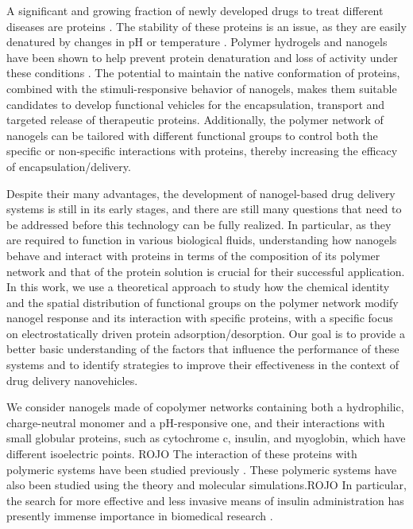 A significant and growing fraction of newly developed drugs to treat different diseases are proteins .
The stability of these proteins is an issue, as they are easily denatured by changes in pH or temperature .
Polymer hydrogels and nanogels have been shown to help prevent protein denaturation and loss of activity under these conditions .
The potential to maintain the native conformation of proteins, combined with the stimuli-responsive behavior of nanogels, makes them suitable candidates to develop functional vehicles for the encapsulation, transport and targeted release of therapeutic proteins.
Additionally, the polymer network of nanogels can be tailored with different functional groups to control both the specific or non-specific  interactions with proteins, thereby increasing the efficacy of encapsulation/delivery.



Despite their many advantages, the development of nanogel-based drug delivery systems is still in its early stages, and there are still many questions that need to be addressed before this technology can be fully realized.
In particular, as they are required to function in various biological fluids, understanding how nanogels behave and interact with proteins in terms of the composition of its polymer network and that of the  protein solution is crucial for their successful application.
In this work, we use a theoretical approach to study how the chemical identity and the spatial distribution of functional groups on the polymer network modify nanogel response and its interaction with specific proteins, with a specific focus on electrostatically driven protein adsorption/desorption.
Our goal is to provide a better basic understanding of the factors that influence the performance of these systems and to identify strategies to improve their effectiveness in the context of drug delivery nanovehicles.






We consider nanogels made of copolymer networks containing both a hydrophilic, charge-neutral monomer and a pH-responsive one, and their interactions with small globular proteins, such as cytochrome c, insulin, and myoglobin, which have different isoelectric points.
ROJO
	The interaction of these proteins with polymeric systems have been studied previously .
	These polymeric systems have also been studied using the theory and molecular simulations.
ROJO
In particular, the search for more effective and less invasive means of insulin administration has presently immense importance in biomedical research .




